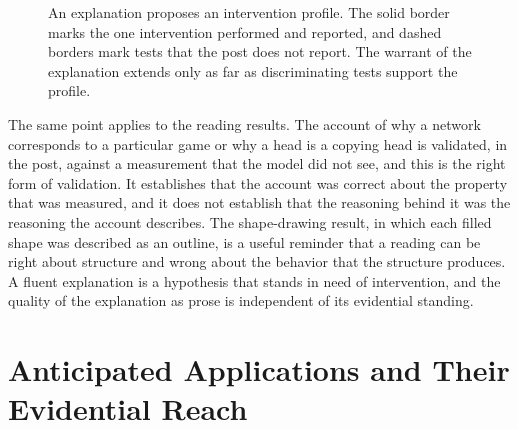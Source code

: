 \documentclass[11pt]{article}
\begin{document}
\begin{figure}[htbp]
\centering
{}
\caption{An explanation proposes an intervention profile. The solid border marks the one intervention performed and reported, and dashed borders mark tests that the post does not report. The warrant of the explanation extends only as far as discriminating tests support the profile.}
\label{fig:profile}
\end{figure}

The same point applies to the reading results. The account of why a network corresponds to a particular game or why a head is a copying head is validated, in the post, against a measurement that the model did not see, and this is the right form of validation. It establishes that the account was correct about the property that was measured, and it does not establish that the reasoning behind it was the reasoning the account describes. The shape-drawing result, in which each filled shape was described as an outline, is a useful reminder that a reading can be right about structure and wrong about the behavior that the structure produces. A fluent explanation is a hypothesis that stands in need of intervention, and the quality of the explanation as prose is independent of its evidential standing.

\section{Anticipated Applications and Their Evidential Reach}
\end{document}
